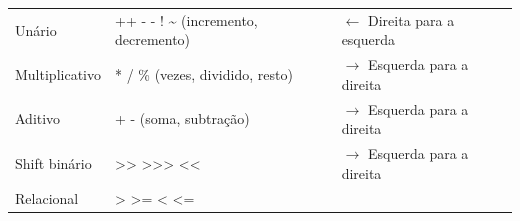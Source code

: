 \documentclass[12pt,a4paper]{article}
\begin{document}
\begin{longtable}[]{@{}lll@{}}
\begin{minipage}[t]{0.26\columnwidth}
Unário\strut
\end{minipage} & \begin{minipage}[t]{0.44\columnwidth}\raggedright
++ - - ! \textasciitilde{} (incremento, decremento)\strut
\end{minipage} & \begin{minipage}[t]{0.21\columnwidth}\raggedright
\(\leftarrow\) Direita para a esquerda\strut
\end{minipage}\tabularnewline
\begin{minipage}[t]{0.26\columnwidth}\raggedright
Multiplicativo\strut
\end{minipage} & \begin{minipage}[t]{0.44\columnwidth}\raggedright
* / \% (vezes, dividido, resto)\strut
\end{minipage} & \begin{minipage}[t]{0.21\columnwidth}\raggedright
\(\rightarrow\) Esquerda para a direita\strut
\end{minipage}\tabularnewline
\begin{minipage}[t]{0.26\columnwidth}\raggedright
Aditivo\strut
\end{minipage} & \begin{minipage}[t]{0.44\columnwidth}\raggedright
+ - (soma, subtração)\strut
\end{minipage} & \begin{minipage}[t]{0.21\columnwidth}\raggedright
\(\rightarrow\) Esquerda para a direita\strut
\end{minipage}\tabularnewline
\begin{minipage}[t]{0.26\columnwidth}\raggedright
Shift binário\strut
\end{minipage} & \begin{minipage}[t]{0.44\columnwidth}\raggedright
\textgreater\textgreater{} \textgreater\textgreater\textgreater{}
\textless\textless{}\strut
\end{minipage} & \begin{minipage}[t]{0.21\columnwidth}\raggedright
\(\rightarrow\) Esquerda para a direita\strut
\end{minipage}\tabularnewline
\begin{minipage}[t]{0.26\columnwidth}\raggedright
Relacional\strut
\end{minipage} & \begin{minipage}[t]{0.44\columnwidth}\raggedright
\textgreater{} \textgreater= \textless{} \textless=\strut
\end{minipage} & \begin{minipage}[t]{0.21\columnwidth}\raggedright

\end{minipage}
\end{longtable}
\end{document}
